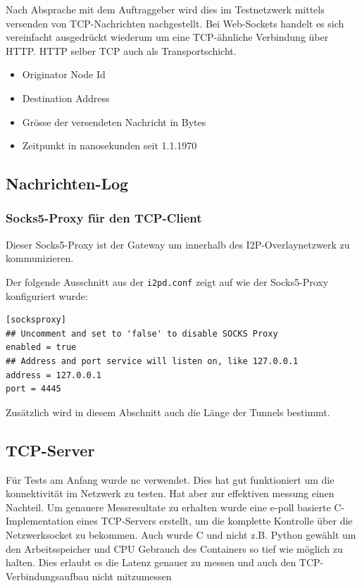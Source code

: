 Nach Absprache mit dem Auftraggeber wird dies im Testnetzwerk mittels versenden von TCP-Nachrichten nachgestellt.
Bei Web-Sockets handelt es sich vereinfacht ausgedrückt wiederum um eine TCP-ähnliche Verbindung über HTTP. HTTP selber TCP auch als Transportschicht.


\begin{itemize}
    \item Originator Node Id
    \item Destination Address
    \item Grösse der versendeten Nachricht in Bytes
    \item Zeitpunkt in nanosekunden seit 1.1.1970 
\end{itemize}

\subsection{Nachrichten-Log}


\subsubsection{Socks5-Proxy für den TCP-Client}

Dieser Socks5-Proxy ist der Gateway um innerhalb des I2P-Overlaynetzwerk zu kommunizieren.

Der folgende Ausschnitt aus der \lstinline|i2pd.conf| zeigt auf wie der Socks5-Proxy konfiguriert wurde:

\begin{lstlisting}
[socksproxy]
## Uncomment and set to 'false' to disable SOCKS Proxy
enabled = true
## Address and port service will listen on, like 127.0.0.1
address = 127.0.0.1
port = 4445
\end{lstlisting}

Zusätzlich wird in diesem Abschnitt auch die Länge der Tunnels bestimmt.

\subsection{TCP-Server}


Für Tests am Anfang wurde nc verwendet. Dies hat gut funktioniert um die konnektivität im Netzwerk zu testen. Hat aber zur effektiven messung einen Nachteil.
Um genauere Messresultate zu erhalten wurde eine e-poll basierte C-Implementation eines TCP-Servers erstellt, um die komplette Kontrolle über die Netzwerksocket zu bekommen.
Auch wurde C und nicht z.B. Python gewählt um den Arbeitsspeicher und CPU Gebrauch des Containers so tief wie möglich zu halten.
Dies erlaubt es die Latenz genauer zu messen und auch den TCP-Verbindungsaufbau nicht mitzumessen

